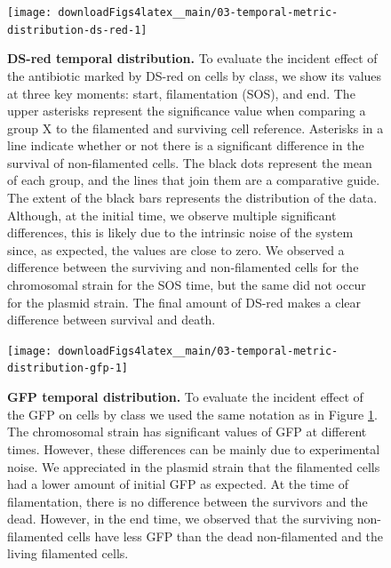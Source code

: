 \documentclass[a4paper, nobind]{templates/ociamthesis}
\begin{document}
\begin{figure}[H]
\texttt{[image: downloadFigs4latex\_\_main/03-temporal-metric-distribution-ds-red-1]} \caption[DS-red temporal distribution.]{\textbf{DS-red temporal distribution.} To evaluate the incident effect of the antibiotic marked by DS-red on cells by class, we show its values \hspace{0pt}\hspace{0pt}at three key moments: start, filamentation (SOS), and end. The upper asterisks represent the significance value when comparing a group X to the filamented and surviving cell reference. Asterisks in a line indicate whether or not there is a significant difference in the survival of non-filamented cells. The black dots represent the mean of each group, and the lines that join them are a comparative guide. The extent of the black bars represents the distribution of the data. Although, at the initial time, we observe multiple significant differences, this is likely due to the intrinsic noise of the system since, as expected, the values \hspace{0pt}\hspace{0pt}are close to zero. We observed a difference between the surviving and non-filamented cells for the chromosomal strain for the SOS time, but the same did not occur for the plasmid strain. The final amount of DS-red makes a clear difference between survival and death.}\label{fig:03-temporal-metric-distribution-ds-red-1}
\end{figure}





\begin{figure}[H]
\texttt{[image: downloadFigs4latex\_\_main/03-temporal-metric-distribution-gfp-1]} \caption[GFP temporal distribution.]{\textbf{GFP temporal distribution.} To evaluate the incident effect of the GFP on cells by class we used the same notation as in Figure \ref{fig:03-temporal-metric-distribution-ds-red-1}. The chromosomal strain has significant values of GFP \hspace{0pt}\hspace{0pt}at different times. However, these differences can be mainly due to experimental noise. We appreciated in the plasmid strain that the filamented cells had a lower amount of initial GFP as expected. At the time of filamentation, there is no difference between the survivors and the dead. However, in the end time, we observed that the surviving non-filamented cells have less GFP than the dead non-filamented and the living filamented cells.}\label{fig:03-temporal-metric-distribution-gfp-1}
\end{figure}
\end{document}
